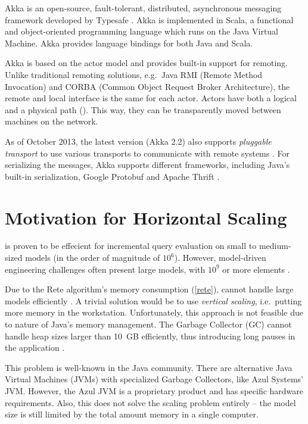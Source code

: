Akka is an open-source, fault-tolerant, distributed, asynchronous messaging framework developed by Typesafe \cite{Akka}.
Akka is implemented in Scala, a functional and object-oriented programming language which runs on the Java Virtual Machine. Akka provides language bindings for both Java and Scala.


Akka is based on the actor model \cite{Hewitt:1973:UMA:1624775.1624804} and provides built-in support for remoting. Unlike traditional remoting solutions, e.g.\ Java RMI (Remote Method Invocation) and CORBA (Common Object Request Broker Architecture), the remote and local interface is the same for each actor. Actors have both a logical and a physical path (). This way, they can be transparently moved between machines on the network.

As of October 2013, the latest version (Akka 2.2) also supports \textit{pluggable transport} to use various transports to communicate with remote systems \cite{Akka}. For serializing the messages, Akka supports different frameworks, including Java's built-in serialization, Google Protobuf \cite{Protobuf} and Apache Thrift \cite{Thrift}.

\section{Motivation for Horizontal Scaling}

\eiq{} is proven to be effecient for incremental query evaluation on small to medium-sized models (in the order of magnitude of $10^6$). However, model-driven engineering challenges often present large models, with $10^9$ or more elements \cite{Scheidgen12}.

Due to the Rete algorithm's memory consumption (\autoref{rete}), \eiq{} cannot handle large models efficiently \cite{models10}. A trivial solution would be to use \emph{vertical scaling}, i.e.\ putting more memory in the workstation. Unfortunately, this approach is not feasible due to nature of Java's memory management. The Garbage Collector (GC) cannot handle heap sizes larger than 10~GB efficiently, thus introducing long pauses in the application \cite{Azul}. 

This problem is well-known in the Java community. There are alternative Java Virtual Machines (JVMs) with specialized Garbage Collectors, like Azul Systems' JVM. However, the Azul JVM is a proprietary product and has specific hardware requirements. Also, this does not solve the scaling problem entirely -- the model size is still limited by the total amount memory in a single computer.

